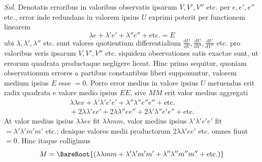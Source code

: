 \textit{Sol.} Denotatis erroribus in valoribus observatis ipsarum \(V,V',V''\) etc. per \(e,e',e''\) etc., error inde redundans in valorem ipsius \(U\) exprimi poterit per functionem linearem
\[
\lambda e+\lambda'e'+\lambda''e''+\text{etc.}=E
\]
ubi \(\lambda,\lambda',\lambda''\) etc. sunt valores quotientium differentialium \(\frac{\mathrm{d}U}{\mathrm{d}V},\frac{\mathrm{d}U}{\mathrm{d}V'},\frac{\mathrm{d}U}{\mathrm{d}V''}\) etc. pro valoribus veris ipsarum \(V,V',V''\) etc. siquidem observationes satis exactae sunt, ut errorum quadrata productaque negligere liceat. Hinc primo sequitur, quoniam observationum errores a partibus constantibus liberi supponuntur, valorem medium ipsius \(E\) esse \(=0\). Porro error medius in valore ipsius \(U\) metuendus erit radix quadrata e valore medio ipsius \(EE\), sive \(MM\) erit valor medius aggregati
\[
\begin{aligned}
\lambda\lambda ee+\lambda'\lambda'e'e'+\lambda''\lambda''e''e''+\text{etc.}{}\\
{}+2\lambda\lambda'ee'+2\lambda\lambda''ee''+2\lambda'\lambda''e'e''+\text{etc.}
\end{aligned}
\]
At valor medius ipsius \(\lambda\lambda ee\) fit \(\lambda\lambda mm\), valor medius ipsius \(\lambda'\lambda'e'e'\) fit \(=\lambda'\lambda'm'm'\) etc.; denique valores medii productorum \(2\lambda\lambda'ee'\) etc. omnes fiunt \(=0\). Hinc itaque colligimus
\[
M=\BareRoot{(\lambda\lambda mm+\lambda'\lambda'm'm'+\lambda''\lambda''m''m''+\text{etc.})}
\]
